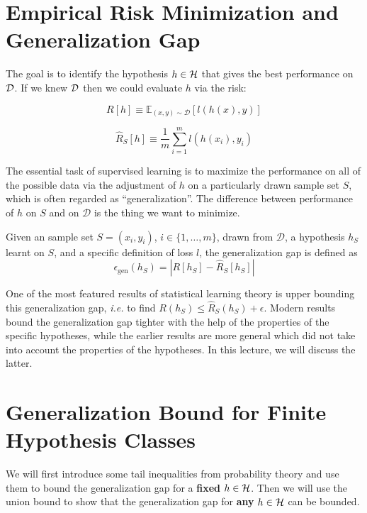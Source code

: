 \documentclass{article}
\begin{document}
\section{Empirical Risk Minimization and Generalization Gap}
The goal is to identify the hypothesis $h \in \mathcal{H}$ that gives the best performance on $\mathcal{D}$. If we knew $\mathcal{D}$ then we could evaluate $h$ via the risk:

\begin{defn}
$$R[h] \equiv \mathbb{E}_{(x,y)\sim\mathcal{D}}[l(h(x), y)]$$
\end{defn}

\begin{defn}
$$\hat{R}_{S}[h] \equiv \frac{1}{m} \sum_{i=1}^{m}{l(h(x_i), y_i)}$$
\end{defn}


The essential task of supervised learning is to maximize the performance on all of the possible data via the adjustment of $h$ on a particularly drawn sample set $S$, which is often regarded as ``generalization''. The difference between performance of $h$ on $S$ and on $\mathcal{D}$ is the thing we want to minimize.

\begin{defn}
Given an sample set $S = {(x_i, y_i)}$, $i \in \{1, \dots, m\}$, drawn \iid{} from $\mathcal{D}$, a hypothesis $h_S$ learnt on $S$, and a specific definition of loss $l$, the generalization gap is defined as
$$\epsilon_{\text{gen}}(h_S) = | R[h_S] - \hat{R}_{S}[h_S] |$$
\end{defn}

One of the most featured results of statistical learning theory is upper bounding this generalization gap, \textit{i.e.} to find $R(h_S) \leq \hat{R}_{S}(h_S) + \epsilon$. Modern results bound the generalization gap tighter with the help of the properties of the specific hypotheses, while the earlier results are more general which did not take into account the properties of the hypotheses. In this lecture, we will discuss the latter.

\section{Generalization Bound for Finite Hypothesis Classes}
We will first introduce some tail inequalities from probability theory and use them to bound the generalization gap for a \textbf{fixed} $h \in \mathcal{H}$. Then we will use the union bound to show that the generalization gap for \textbf{any} $h \in \mathcal{H}$ can be bounded.  
\end{document}
